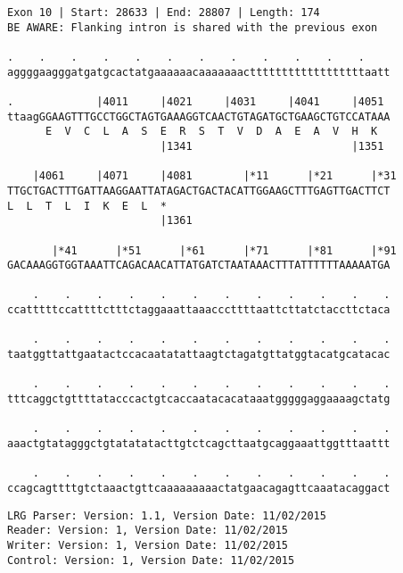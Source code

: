 \documentclass{article}
\begin{document}
\begin{Verbatim}
Exon 10 | Start: 28633 | End: 28807 | Length: 174
BE AWARE: Flanking intron is shared with the previous exon
 
.    .    .    .    .    .    .    .    .    .    .    .    
aggggaagggatgatgcactatgaaaaaacaaaaaaacttttttttttttttttttaatt
  
.             |4011     |4021     |4031     |4041     |4051 
ttaagGGAAGTTTGCCTGGCTAGTGAAAGGTCAACTGTAGATGCTGAAGCTGTCCATAAA
      E  V  C  L  A  S  E  R  S  T  V  D  A  E  A  V  H  K  
                        |1341                         |1351 
  
    |4061     |4071     |4081        |*11      |*21      |*31
TTGCTGACTTTGATTAAGGAATTATAGACTGACTACATTGGAAGCTTTGAGTTGACTTCT
L  L  T  L  I  K  E  L  *   
                        |1361                               
  
       |*41      |*51      |*61      |*71      |*81      |*91
GACAAAGGTGGTAAATTCAGACAACATTATGATCTAATAAACTTTATTTTTTAAAAATGA
  
    .    .    .    .    .    .    .    .    .    .    .    .
ccatttttccattttctttctaggaaattaaacccttttaattcttatctaccttctaca
  
    .    .    .    .    .    .    .    .    .    .    .    .
taatggttattgaatactccacaatatattaagtctagatgttatggtacatgcatacac
  
    .    .    .    .    .    .    .    .    .    .    .    .
tttcaggctgttttatacccactgtcaccaatacacataaatgggggaggaaaagctatg
  
    .    .    .    .    .    .    .    .    .    .    .    .
aaactgtatagggctgtatatatacttgtctcagcttaatgcaggaaattggtttaattt
  
    .    .    .    .    .    .    .    .    .    .    .    .
ccagcagttttgtctaaactgttcaaaaaaaaactatgaacagagttcaaatacaggact
\end{Verbatim}
\newpage
\begin{Verbatim}
LRG Parser: Version: 1.1, Version Date: 11/02/2015
Reader: Version: 1, Version Date: 11/02/2015
Writer: Version: 1, Version Date: 11/02/2015
Control: Version: 1, Version Date: 11/02/2015
\end{Verbatim}
\end{document}
